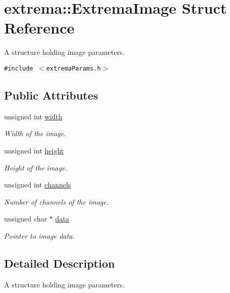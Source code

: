 \hypertarget{structextrema_1_1ExtremaImage}{
\section{extrema::Extrema\-Image Struct Reference}
\label{structextrema_1_1ExtremaImage}
}
A structure holding image parameters.  


{\tt \#include $<$extrema\-Params.h$>$}

\subsection*{Public Attributes}
\begin{CompactItemize}
\item 
unsigned int \hyperlink{structextrema_1_1ExtremaImage_c72e8fa175fb17771c24b0afda2af618}{width}
\begin{CompactList}\small\item\em Width of the image. \item\end{CompactList}\item 
unsigned int \hyperlink{structextrema_1_1ExtremaImage_28dcc2053047bc6b721cc3bc7e834ef1}{height}
\begin{CompactList}\small\item\em Height of the image. \item\end{CompactList}\item 
unsigned int \hyperlink{structextrema_1_1ExtremaImage_c9b071c294514d52fb545196b2148edb}{channels}
\begin{CompactList}\small\item\em Number of channels of the image. \item\end{CompactList}\item 
unsigned char $\ast$ \hyperlink{structextrema_1_1ExtremaImage_9d987c2f0a4b445e96a8cdd9ad5a728c}{data}
\begin{CompactList}\small\item\em Pointer to image data. \item\end{CompactList}\end{CompactItemize}


\subsection{Detailed Description}
A structure holding image parameters. 



